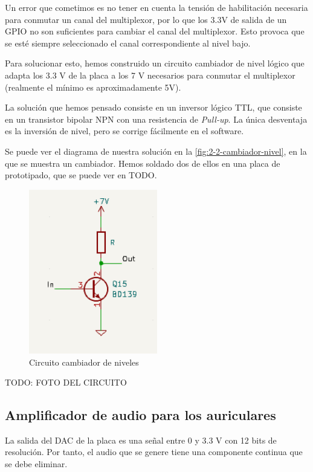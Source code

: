 Un error que cometimos es no tener en cuenta la tensión de habilitación necesaria para conmutar un canal del multiplexor, por lo que los 3.3V de salida de un GPIO no son suficientes para cambiar el canal del multiplexor. Esto provoca que se esté siempre seleccionado el canal correspondiente al nivel bajo.

Para solucionar esto, hemos construido un circuito cambiador de nivel lógico que adapta los 3.3 V de la placa a los 7 V necesarios para conmutar el multiplexor (realmente el mínimo es aproximadamente 5V).

La solución que hemos pensado consiste en un inversor lógico TTL, que consiste en un transistor bipolar NPN con una resistencia de \textit{Pull-up}. La única desventaja es la inversión de nivel, pero se corrige fácilmente en el software.

Se puede ver el diagrama de nuestra solución en la \autoref{fig:2-2-cambiador-nivel}, en la que se muestra un cambiador. Hemos soldado dos de ellos en una placa de prototipado, que se puede ver en TODO.

\begin{figure}[h]
    \centering
    \includegraphics[width=0.5\textwidth]{images/2/2-2/circuitoCambiadorNivel.png}
    \caption{Circuito cambiador de niveles}
    \label{fig:label}
\end{figure}

TODO: FOTO DEL CIRCUITO

\subsection{Amplificador de audio para los auriculares}

La salida del DAC de la placa es una señal entre 0 y 3.3 V con 12 bits de resolución. Por tanto, el audio que se genere tiene una componente continua que se debe eliminar. 

